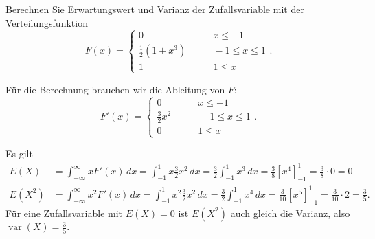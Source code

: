 Berechnen Sie Erwartungswert und Varianz der Zufallsvariable mit der
Verteilungsfunktion
\[
F(x)=\begin{cases}
0&\qquad x\le -1\\
\frac12(1+x^3)&\qquad -1\le x\le 1\\
1&\qquad 1\le x
\end{cases}.
\]


\begin{loesung}
Für die Berechnung brauchen wir die Ableitung von $F$:
\[
F'(x)=\begin{cases}
0&\qquad x\le -1\\
\frac32x^2&\qquad -1\le x\le 1\\
0&\qquad 1\le x
\end{cases}.
\]

Es gilt
\begin{align*}
E(X)
&=\int_{-\infty}^{\infty}x F'(x)\,dx
=\int_{-1}^1x \frac32x^2\,dx
=\frac32\int_{-1}^1x^3\,dx
=\frac38\left[x^4\right]_{-1}^1
=\frac38\cdot 0=0\\
E(X^2)
&=\int_{-\infty}^{\infty}x^2 F'(x)\,dx
=\int_{-1}^1x^2 \frac32x^2\,dx
=\frac32\int_{-1}^1x^4\,dx=\frac3{10}\left[x^5\right]_{-1}^1
=\frac3{10}\cdot 2=\frac35.
\end{align*}
Für eine Zufallsvariable mit $E(X)=0$ ist $E(X^2)$ auch gleich
die Varianz, also $\operatorname{var}(X)=\frac35.$
\end{loesung}

